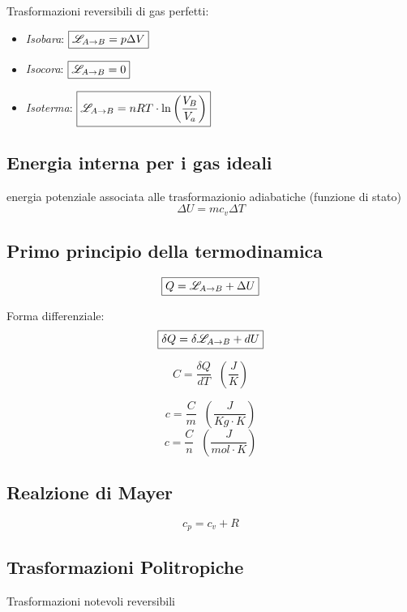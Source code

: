 Trasformazioni reversibili di gas perfetti:
\begin{itemize}
    \item \emph{Isobara}: $\boxed{\mathscr{L}_{A \to B} = p \Delta V}$
    \item \emph{Isocora}: $\boxed{\mathscr{L}_{A \to B} = 0}$
    \item \emph{Isoterma}: $\boxed{\mathscr{L}_{A \to B} = nRT \cdot \ln{\left (\frac{V_B}{V_a} \right)}}$
\end{itemize}

\subsection{Energia interna per i gas ideali}
 energia potenziale associata alle trasformazionio adiabatiche (funzione di stato)
\begin{equation}
    \boxed{\Delta U = m c_v \Delta T}
\end{equation}

\subsection{Primo principio della termodinamica}
\begin{equation}
    \boxed{Q= \mathscr{L}_{A \to B} + \Delta U}
\end{equation}

Forma differenziale:
\begin{equation}
    \boxed{\delta Q= \delta \mathscr{L}_{A \to B} + dU}
\end{equation}

\vspace{\baselineskip}
\[
C = \frac{\delta Q}{dT} \;\; \left( \frac{J}{K} \right)
\]

\vspace{\baselineskip}
\[
c = \frac{C}{m} \;\; \left( \frac{J}{Kg \cdot K} \right) 
\]
\[
c = \frac{C}{n} \;\; \left( \frac{J}{mol \cdot K} \right)
\]

\subsection{Realzione di Mayer}
\begin{equation}
    c_p = c_v + R
\end{equation}

\subsection{Trasformazioni Politropiche}
Trasformazioni notevoli reversibili

